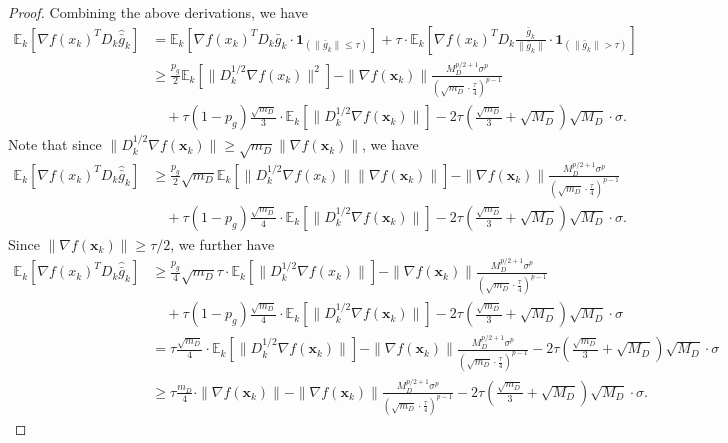 \documentclass[10pt,a4paper]{amsart}
\newcommand{\barg}{\bar{g}}
\newcommand{\bx}{\boldsymbol{x}}
\begin{document}
\begin{proof}
Combining the above derivations, we have
\begin{align*}
    \mathbb{E}_k[\nabla f(x_k)^T D_k \widehat{\barg}_k ] & = \mathbb{E}_k[\nabla f(x_k)^T D_k \bar{g}_k \cdot \boldsymbol{1}_{(\|\bar{g}_k\| \le \tau)} ]  + \tau \cdot \mathbb{E}_k\left[\nabla f(x_k)^T D_k \frac{\bar{g}_k}{\|\bar{g}_k\|} \cdot \boldsymbol{1}_{(\|\bar{g}_k\| > \tau)} \right] \\
    & \geq \frac{p_g}{2}\mathbb{E}_k[\| D_k^{1/2} \nabla f(x_k)\|^2] -  \|\nabla f(\bx_k)\|\frac{M_D^{p/2+1} \sigma^p}{\left(\sqrt{m_D}\cdot\frac{\tau}{4}\right)^{p-1}} \\
    & \quad + \tau (1-p_g) \frac{\sqrt{m_D}}{3} \cdot \mathbb{E}_k\left[\| D_k^{1/2}\nabla f(\bx_k)\|\right]  - 2\tau \left( \frac{\sqrt{m_D}}{3} + \sqrt{M_D}\right) \sqrt{M_D} \cdot \sigma .
\end{align*}
Note that since $\|D_k^{1/2}\nabla f(\bx_k)\|\geq \sqrt{m_D}\|\nabla f(\bx_k)\|$, we have
\begin{align*}
    \mathbb{E}_k[\nabla f(x_k)^T D_k \widehat{\barg}_k ]
    & \geq \frac{p_g}{2}\sqrt{m_D}\mathbb{E}_k[\| D_k^{1/2} \nabla f(x_k)\|\|\nabla f(\bx_k)\|] -  \|\nabla f(\bx_k)\|\frac{M_D^{p/2+1} \sigma^p}{\left(\sqrt{m_D}\cdot\frac{\tau}{4}\right)^{p-1}} \\
    & \quad + \tau (1-p_g) \frac{\sqrt{m_D}}{4} \cdot \mathbb{E}_k\left[\| D_k^{1/2}\nabla f(\bx_k)\|\right]  - 2\tau \left( \frac{\sqrt{m_D}}{3} + \sqrt{M_D}\right) \sqrt{M_D} \cdot \sigma .
\end{align*}
Since $\|\nabla f(\bx_k)\|\geq \tau/2$, we further have
\begin{align*}
    \mathbb{E}_k[\nabla f(x_k)^T D_k \widehat{\barg}_k ]
    & \geq \frac{p_g}{4}\sqrt{m_D}\tau\cdot\mathbb{E}_k[\| D_k^{1/2} \nabla f(x_k)\|] -  \|\nabla f(\bx_k)\|\frac{M_D^{p/2+1} \sigma^p}{\left(\sqrt{m_D}\cdot\frac{\tau}{4}\right)^{p-1}} \\
    & \quad + \tau (1-p_g) \frac{\sqrt{m_D}}{4} \cdot \mathbb{E}_k\left[\| D_k^{1/2}\nabla f(\bx_k)\|\right]  - 2\tau \left( \frac{\sqrt{m_D}}{3} + \sqrt{M_D}\right) \sqrt{M_D} \cdot \sigma \\
    & = \tau  \frac{\sqrt{m_D}}{4} \cdot \mathbb{E}_k\left[\| D_k^{1/2}\nabla f(\bx_k)\|\right] -  \|\nabla f(\bx_k)\|\frac{M_D^{p/2+1} \sigma^p}{\left(\sqrt{m_D}\cdot\frac{\tau}{4}\right)^{p-1}} - 2\tau \left( \frac{\sqrt{m_D}}{3} + \sqrt{M_D}\right) \sqrt{M_D} \cdot \sigma \\
    & \geq \tau  \frac{m_D}{4} \cdot \| \nabla f(\bx_k)\| -  \|\nabla f(\bx_k)\|\frac{M_D^{p/2+1} \sigma^p}{\left(\sqrt{m_D}\cdot\frac{\tau}{4}\right)^{p-1}} - 2\tau \left( \frac{\sqrt{m_D}}{3} + \sqrt{M_D}\right) \sqrt{M_D} \cdot \sigma.

\end{align*}
\end{proof}
\end{document}
